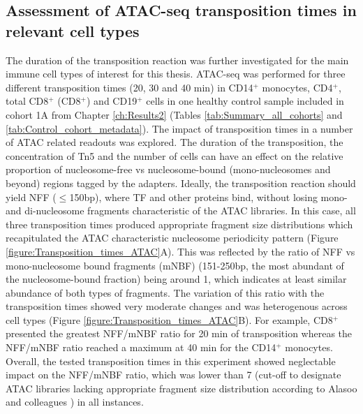 \bigskip %



\subsection{Assessment of ATAC-seq transposition times in relevant cell types}
\label{ATACseq}

The duration of the transposition reaction was further investigated for the main immune cell types of interest for this thesis. ATAC-seq was performed for three different transposition times (20, 30 and 40 min) in CD14$^+$ monocytes, CD4$^+$, total CD8$^+$ (CD8$^+$) and CD19$^+$ cells in one healthy control sample included in cohort 1A from Chapter \ref{ch:Results2} (Tables \ref{tab:Summary_all_cohorts} and \ref{tab:Control_cohort_metadata}). The impact of transposition times in a number of ATAC related readouts was explored. The duration of the transposition, the concentration of Tn5 and the number of cells can have an effect on the relative proportion of nucleosome-free vs nucleosome-bound (mono-nucleosomes and beyond) regions tagged by the adapters. Ideally, the transposition reaction should yield NFF ($\leq$150bp), where TF and other proteins bind, without losing mono- and di-nucleosome fragments characteristic of the ATAC libraries. In this case, all three transposition times produced appropriate fragment size distributions which recapitulated the ATAC characteristic nucleosome periodicity pattern (Figure \ref{figure:Transposition_times_ATAC}A). This was reflected by the ratio of NFF vs mono-nucleosome bound fragments (mNBF) (151-250bp, the most abundant of the nucleosome-bound fraction) being around 1, which indicates at least similar abundance of both types of fragments. The variation of this ratio with the transposition times showed very moderate changes and was heterogenous across cell types (Figure \ref{figure:Transposition_times_ATAC}B). For example, CD8$^+$ presented the greatest NFF/mNBF ratio for 20 min of transposition whereas the NFF/mNBF ratio reached a maximum at 40 min for the CD14$^+$ monocytes. Overall, the tested transposition times in this experiment showed neglectable impact on the NFF/mNBF ratio, which was lower than 7 (cut-off to designate ATAC libraries lacking appropriate fragment size distribution according to Alasoo and colleagues \parencite{Alasoo2018}) in all instances. 

